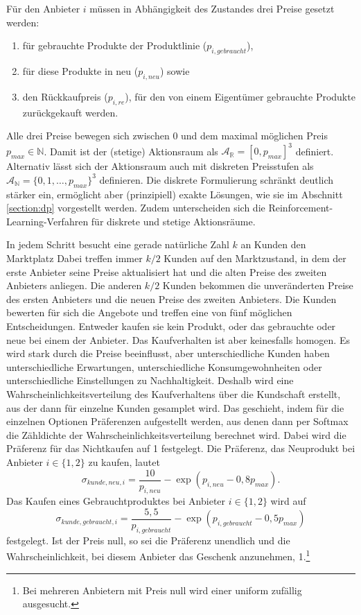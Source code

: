 Für den Anbieter $i$ müssen in Abhängigkeit des Zustandes drei Preise gesetzt werden:
\begin{enumerate}
	\item für gebrauchte Produkte der Produktlinie ($p_{i, gebraucht}$),
	\item für diese Produkte in neu ($p_{i, neu}$) sowie
	\item den Rückkaufpreis ($p_{i, re}$), für den von einem Eigentümer gebrauchte Produkte zurückgekauft werden.
\end{enumerate}
Alle drei Preise bewegen sich zwischen 0 und dem maximal möglichen Preis $p_{max} \in \mathbb{N}$.
Damit ist der (stetige) Aktionsraum als $\mathcal{A}_\mathbb{R}=[0, p_{max}]^3$ definiert.
Alternativ lässt sich der Aktionsraum auch mit diskreten Preisstufen als $\mathcal{A}_\mathbb{N}=\{0, 1, \ldots, p_{max}\}^3$ definieren.
Die diskrete Formulierung schränkt deutlich stärker ein, ermöglicht aber (prinzipiell) exakte Lösungen, wie sie im Abschnitt \ref{section:dp} vorgestellt werden.
Zudem unterscheiden sich die Reinforcement-Learning-Verfahren für diskrete und stetige Aktionsräume.

In jedem Schritt besucht eine gerade natürliche Zahl $k$ an Kunden den Marktplatz
Dabei treffen immer $k / 2$ Kunden auf den Marktzustand, in dem der erste Anbieter seine Preise aktualisiert hat und die alten Preise des zweiten Anbieters anliegen.
Die anderen $k / 2$ Kunden bekommen die unveränderten Preise des ersten Anbieters und die neuen Preise des zweiten Anbieters.
Die Kunden bewerten für sich die Angebote und treffen eine von fünf möglichen Entscheidungen.
Entweder kaufen sie kein Produkt, oder das gebrauchte oder neue bei einem der Anbieter.
Das Kaufverhalten ist aber keinesfalls homogen.
Es wird stark durch die Preise beeinflusst, aber unterschiedliche Kunden haben unterschiedliche Erwartungen, unterschiedliche Konsumgewohnheiten oder unterschiedliche Einstellungen zu Nachhaltigkeit.
Deshalb wird eine Wahrscheinlichkeitsverteilung des Kaufverhaltens über die Kundschaft erstellt, aus der dann für einzelne Kunden gesamplet wird.
Das geschieht, indem für die einzelnen Optionen Präferenzen aufgestellt werden, aus denen dann per Softmax die Zähldichte der Wahrscheinlichkeitsverteilung berechnet wird.
Dabei wird die Präferenz für das Nichtkaufen auf 1 festgelegt.
Die Präferenz, das Neuprodukt bei Anbieter $i\in\{1, 2\}$ zu kaufen, lautet
\begin{equation}
	\sigma_{kunde, neu, i} = \frac{10}{p_{i, neu}} - \exp{(p_{i, neu} - 0,8 p_{max})}.
\end{equation}
Das Kaufen eines Gebrauchtproduktes bei Anbieter $i\in\{1, 2\}$ wird auf
\begin{equation}
	\sigma_{kunde, gebraucht, i} = \frac{5,5}{p_{i, gebraucht}} - \exp{(p_{i, gebraucht} - 0,5 p_{max})}
\end{equation}
festgelegt.
Ist der Preis null, so sei die Präferenz unendlich und die Wahrscheinlichkeit, bei diesem Anbieter das Geschenk anzunehmen, 1.\footnote{Bei mehreren Anbietern mit Preis null wird einer uniform zufällig ausgesucht.}

